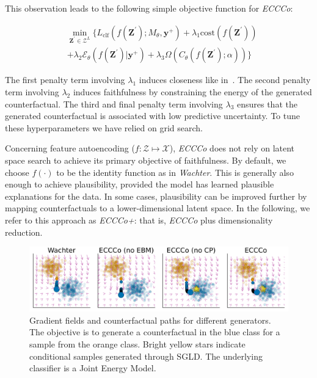 \documentclass[letterpaper]{article} %
\begin{document}
This observation leads to the following simple objective function for \textit{ECCCo}:

\begin{equation} \label{eq:eccco}
  \begin{aligned}
  & \min_{\mathbf{Z}^\prime \in \mathcal{Z}^L} \{  {L_{\text{clf}}(f(\mathbf{Z}^\prime);M_{\theta},\mathbf{y}^+)}+ \lambda_1 {\text{cost}(f(\mathbf{Z}^\prime)) } \\
  &+ \lambda_2 \mathcal{E}_{\theta}(f(\mathbf{Z}^\prime)|\mathbf{y}^+) + \lambda_3 \Omega(C_{\theta}(f(\mathbf{Z}^\prime);\alpha)) \} 
  \end{aligned} 
\end{equation}

The first penalty term involving $\lambda_1$ induces closeness like in~\citet{wachter2017counterfactual}. The second penalty term involving $\lambda_2$ induces faithfulness by constraining the energy of the generated counterfactual. The third and final penalty term involving $\lambda_3$ ensures that the generated counterfactual is associated with low predictive uncertainty. To tune these hyperparameters we have relied on grid search.

Concerning feature autoencoding ($f: \mathcal{Z} \mapsto \mathcal{X}$), \textit{ECCCo} does not rely on latent space search to achieve its primary objective of faithfulness. By default, we choose $f(\cdot)$ to be the identity function as in \textit{Wachter}. This is generally also enough to achieve plausibility, provided the model has learned plausible explanations for the data. In some cases, plausibility can be improved further by mapping counterfactuals to a lower-dimensional latent space. In the following, we refer to this approach as \textit{ECCCo+}: that is, \textit{ECCCo} plus dimensionality reduction.

\begin{figure}
  \centering
  \includegraphics[width=0.75\linewidth]{figures/poc_gradient_fields.png}
  \caption{Gradient fields and counterfactual paths for different generators. The objective is to generate a counterfactual in the blue class for a sample from the orange class. Bright yellow stars indicate conditional samples generated through SGLD. The underlying classifier is a Joint Energy Model.}\label{fig:poc}
\end{figure}  
\end{document}

